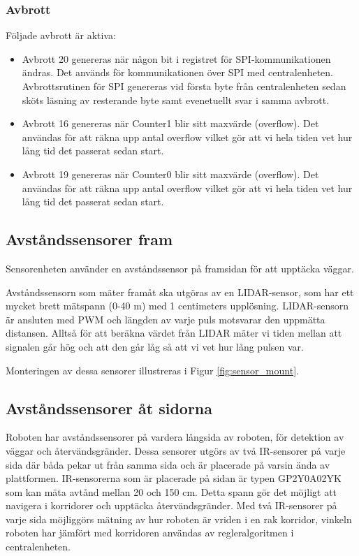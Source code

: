 \documentclass[a4paper,titlepage,12pt]{article}
\begin{document}
    \subsubsection{Avbrott}
	Följade avbrott är aktiva:
    \begin{itemize}
        \item Avbrott 20 genereras när någon bit i registret för SPI-kommunikationen
        ändras. Det används för kommunikationen över SPI med centralenheten. 
        Avbrottsrutinen för SPI genereras vid första byte från centralenheten 
        sedan sköts läsning av resterande byte samt evenetuellt svar i samma 
        avbrott. 
		\item Avbrott 16 genereras när Counter1 blir sitt maxvärde (overflow). 
		Det användas för att räkna upp antal overflow vilket gör att vi hela tiden 
		vet hur lång tid det passerat sedan start. 
		\item Avbrott 19 genereras när Counter0 blir sitt maxvärde (overflow). 
		Det användas för att räkna upp antal overflow vilket gör att vi hela tiden 
		vet hur lång tid det passerat sedan start. 
    \end{itemize}
	
    \subsection{Avståndssensorer fram}
        Sensorenheten använder en avståndssensor på framsidan för att upptäcka väggar.

        Avståndssensorn som mäter framåt ska utgöras av en LIDAR-sensor, som har
	    ett mycket brett mätspann (0-40 m) med 1 centimeters upplösning. LIDAR-sensorn
	    är ansluten med PWM och längden av varje puls motsvarar den uppmätta distansen.
	    Alltså för att beräkna värdet från LIDAR mäter vi tiden	mellan att signalen går
	    hög och att den går låg så att vi vet hur lång pulsen var.

	    Monteringen av dessa sensorer illustreras i Figur \ref{fig:sensor_mount}.

        \subsection{Avståndssensorer åt sidorna}
        Roboten har avståndssensorer på vardera långsida av roboten, för
        detektion av väggar och återvändsgränder. Dessa sensorer utgörs av två
        IR-sensorer på varje sida där båda pekar ut från samma sida och
        är placerade på varsin ända av plattformen. IR-sensorerna som är placerade
        på sidan är typen GP2Y0A02YK som kan mäta avtånd mellan 20 och 150 cm.
        Detta spann gör det möjligt att navigera i korridorer och upptäcka
        återvändsgränder. Med två IR-sensorer på varje sida möjliggörs mätning av hur
        roboten är vriden i en rak korridor, vinkeln roboten har jämfört med
        korridoren användas av regleralgoritmen i centralenheten.
\end{document}
